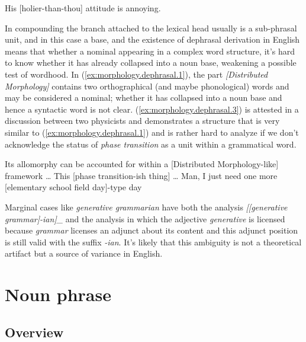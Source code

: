 \documentclass[UTF8, a4paper, oneside, scheme=plain, 12pt]{ctexbook}
\newcommand*{\citepage}[1]{p.~{#1}}
\newcommand{\form}[1]{\emph{#1}}
\begin{document}
\begin{exe}
    \ex\label{ex:morphology.dephrasal.2} His [holier-than-thou] attitude is annoying. \citep[\citepage{1646}]{cgel}
\end{exe}

In compounding the branch attached to the lexical head 
usually is a sub-phrasal unit, and in this case a base,
and the existence of dephrasal derivation in English 
means that whether a nominal appearing in a complex word structure, 
it's hard to know whether it has already collapsed into a noun base,
weakening a possible test of wordhood.
In (\ref{ex:morphology.dephrasal.1}),
the part \form{[Distributed Morphology]}
contains two orthographical (and maybe phonological) words
and may be considered a nominal;
whether it has collapsed into a noun base and hence a syntactic word is not clear.
(\ref{ex:morphology.dephrasal.3}) is attested in 
a discussion between two physicists
and demonstrates a structure that is very similar to (\ref{ex:morphology.dephrasal.1})
and is rather hard to analyze if we don't acknowledge the status of 
\form{phase transition} as a unit within a grammatical word. 

\begin{exe}
    \ex\label{ex:morphology.dephrasal.1} Its allomorphy can be accounted for within a [Distributed Morphology-like] framework \dots
    \ex\label{ex:morphology.dephrasal.3} This [phase transition-ish thing] \dots
    \ex\label{ex:morphology.dephrasal.4} Man, I just need one more [elementary school field day]-type day
\end{exe}

Marginal cases like \form{generative grammarian}
have both the analysis \form{[[generative grammar]-ian]_{}} 
and the analysis in which 
the adjective \form{generative} is licensed 
because \form{grammar} licenses an adjunct about its content 
and this adjunct position is still valid with the suffix \form{-ian}.
It's likely that 
this ambiguity is not a theoretical artifact 
but a source of variance in English.


\chapter{Noun phrase}\label{chap:np}


\section{Overview}\label{sec:np.template}
\end{document}
